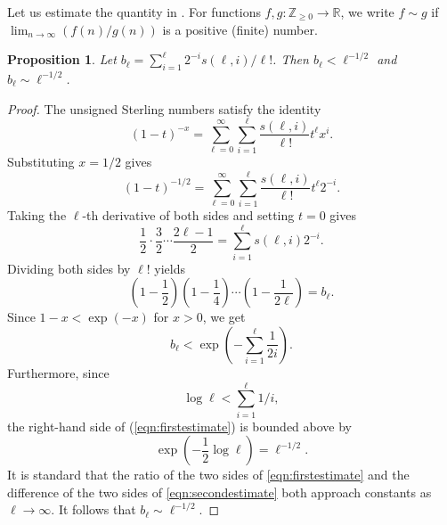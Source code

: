 \documentclass{amsart}
\numberwithin{equation}{section} \numberwithin{figure}{section}
\theoremstyle{one}
\newtheorem{proposition}[theorem]{\textbf{Proposition}}
\theoremstyle{definition}
\begin{document}
Let us estimate the quantity in .
For functions \(f, g \colon \mathbb{Z}_{\geq 0} \to \mathbb{R}\), we write \(f \sim g\) if \(\lim_{n \to \infty}(f(n)/g(n))\) is a positive (finite) number.
\begin{proposition}\label{prop:sterlingapprox}
  Let \(b_\ell = \sum_{i = 1}^\ell 2^{-i} s(\ell,i)/\ell!\).
  Then \(b_\ell < \ell^{-1/2}\) and \(b_\ell \sim \ell^{-1/2}\).
\end{proposition}
\begin{proof}
  The unsigned Sterling numbers satisfy the identity
  \[ (1-t)^{-x} = \sum_{\ell=0}^{\infty} \sum_{i = 1}^{\ell} \frac{s(\ell,i)}{\ell!} t^\ell x^i.\]
  Substituting \(x = 1/2\) gives
  \[ (1-t)^{-1/2} = \sum_{\ell=0}^{\infty} \sum_{i = 1}^{\ell} \frac{s(\ell,i)}{\ell!} t^\ell 2^{-i}.\]
  Taking the \(\ell\)-th derivative of both sides and setting \(t = 0\) gives
  \[ \frac12 \cdot \frac32 \cdots \frac{2\ell-1}{2} = \sum_{i=1}^\ell s(\ell,i)2^{-i}.\]
  Dividing both sides by \(\ell!\) yields
  \begin{equation*}
    \left(1 - \frac{1}{2} \right) \left(1 - \frac{1}{4}\right) \cdots \left(1 - \frac{1}{2\ell}\right) = b_\ell.
  \end{equation*}
  Since \(1-x < \exp(-x)\) for \(x > 0\), we get
  \begin{equation}\label{eqn:firstestimate}
    b_\ell < \exp\left(-\sum_{i=1}^\ell \frac{1}{2i}\right).
  \end{equation}
  Furthermore, since
\begin{equation}\label{eqn:secondestimate}
    \log \ell  < \sum_{i=1}^\ell 1/i,
  \end{equation}
  the right-hand side of (\ref{eqn:firstestimate}) is bounded above by  \[\exp\left(-\frac{1}{2}\log \ell\right) = \ell^{-1/2}.\]
  It is standard that the ratio of the two sides of \eqref{eqn:firstestimate} and the difference of the two sides of \eqref{eqn:secondestimate} both approach  
  constants as \(\ell \to \infty\).
  It follows that \(b_\ell \sim \ell^{-1/2}\).
\end{proof}
\end{document}
